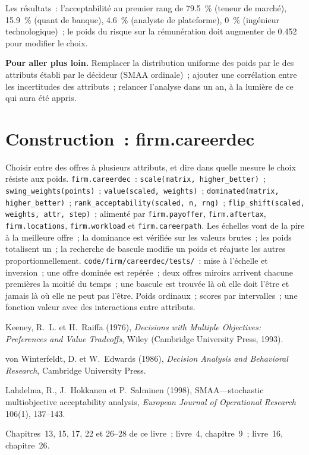Les résultats~: l'acceptabilité au premier rang de 79.5~\% (teneur de marché), 15.9~\% (quant de banque), 4.6~\% (analyste de plateforme), 0~\%
(ingénieur technologique)~; le poids du risque sur la rémunération doit augmenter de 0.452 pour modifier le choix.

\textbf{Pour aller plus loin.} Remplacer la distribution uniforme des poids par le  des attributs établi par le décideur (SMAA
ordinale)~; ajouter une corrélation entre les incertitudes des attributs~; relancer l'analyse dans un an, à la lumière de ce qui aura été appris.

\section{Construction~: firm.careerdec}\label{bld:in:choosing:careerdec}

\begin{build}
 Choisir entre des offres à plusieurs attributs, et dire dans quelle mesure le choix résiste aux poids.
 \texttt{firm.careerdec}~: \texttt{scale(matrix, higher\_better)}~; \texttt{swing\_weights(points)}~;
\texttt{value(scaled, weights)}~; \texttt{dominated(matrix, higher\_better)}~;
\texttt{rank\_acceptability(scaled, n, rng)}~; \texttt{flip\_shift(scaled, weights, attr, step)}~; alimenté par \texttt{firm.payoffer}, \texttt{firm.aftertax},
\texttt{firm.locations}, \texttt{firm.workload} et \texttt{firm.careerpath}.
 Les échelles vont de la pire à la meilleure offre~; la dominance est vérifiée sur les valeurs brutes~; les poids totalisent un~; la
recherche de bascule modifie un poids et réajuste les autres proportionnellement.
 \texttt{code/firm/careerdec/tests/}~: mise à l'échelle et inversion~; une offre dominée est repérée~; deux
offres miroirs arrivent chacune premières la moitié du temps~; une bascule est trouvée là où elle doit l'être et jamais là où elle ne peut pas l'être.
 Poids ordinaux~; scores par intervalles~; une fonction valeur avec des interactions entre attributs.
\end{build}

\begin{omsources}
\item Keeney, R.~L. et H.~Raiffa (1976), \emph{Decisions with Multiple Objectives: Preferences and Value Tradeoffs},
Wiley (Cambridge University Press, 1993).
\item von Winterfeldt, D. et W.~Edwards (1986), \emph{Decision Analysis and Behavioral Research}, Cambridge University
Press.
\item Lahdelma, R., J.~Hokkanen et P.~Salminen (1998), SMAA---stochastic multiobjective acceptability analysis,
\emph{European Journal of Operational Research} 106(1), 137--143.
\item Chapitres~13, 15, 17, 22 et 26--28 de ce livre~; livre~4, chapitre~9~; livre~16, chapitre~26.
\end{omsources}

